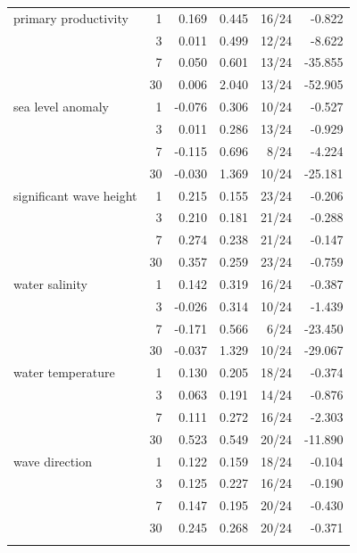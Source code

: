 \begin{tabular}{l r r r r r}
\addlinespace[2pt]
primary productivity & 1 & 0.169 & 0.445 & 16/24 & -0.822 \\
 & 3 & 0.011 & 0.499 & 12/24 & -8.622 \\
 & 7 & 0.050 & 0.601 & 13/24 & -35.855 \\
 & 30 & 0.006 & 2.040 & 13/24 & -52.905 \\
\addlinespace[2pt]
sea level anomaly & 1 & -0.076 & 0.306 & 10/24 & -0.527 \\
 & 3 & 0.011 & 0.286 & 13/24 & -0.929 \\
 & 7 & -0.115 & 0.696 & 8/24 & -4.224 \\
 & 30 & -0.030 & 1.369 & 10/24 & -25.181 \\
\addlinespace[2pt]
significant wave height & 1 & 0.215 & 0.155 & 23/24 & -0.206 \\
 & 3 & 0.210 & 0.181 & 21/24 & -0.288 \\
 & 7 & 0.274 & 0.238 & 21/24 & -0.147 \\
 & 30 & 0.357 & 0.259 & 23/24 & -0.759 \\
\addlinespace[2pt]
water salinity & 1 & 0.142 & 0.319 & 16/24 & -0.387 \\
 & 3 & -0.026 & 0.314 & 10/24 & -1.439 \\
 & 7 & -0.171 & 0.566 & 6/24 & -23.450 \\
 & 30 & -0.037 & 1.329 & 10/24 & -29.067 \\
\addlinespace[2pt]
water temperature & 1 & 0.130 & 0.205 & 18/24 & -0.374 \\
 & 3 & 0.063 & 0.191 & 14/24 & -0.876 \\
 & 7 & 0.111 & 0.272 & 16/24 & -2.303 \\
 & 30 & 0.523 & 0.549 & 20/24 & -11.890 \\
\addlinespace[2pt]
wave direction & 1 & 0.122 & 0.159 & 18/24 & -0.104 \\
 & 3 & 0.125 & 0.227 & 16/24 & -0.190 \\
 & 7 & 0.147 & 0.195 & 20/24 & -0.430 \\
 & 30 & 0.245 & 0.268 & 20/24 & -0.371 \\
\addlinespace[2pt]
\bottomrule
\end{tabular}